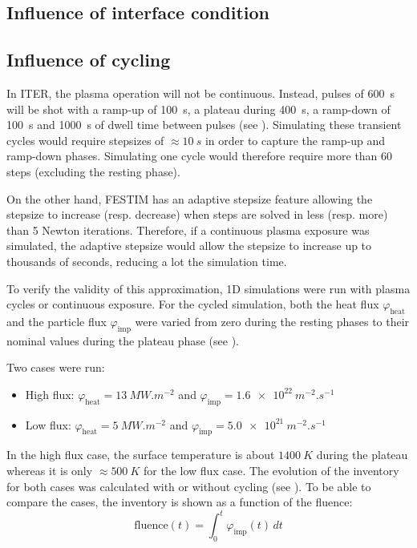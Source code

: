 \subsection{Influence of interface condition}


\subsection{Influence of cycling}

In ITER, the plasma operation will not be continuous.
Instead, pulses of \SI{600}{s} will be shot  with a ramp-up of \SI{100}{s}, a plateau during \SI{400}{s}, a ramp-down of \SI{100}{s} and \SI{1000}{s} of dwell time between pulses (see ).
Simulating these transient cycles would require stepsizes of $\approx \SI{10}{s}$ in order to capture the ramp-up and ramp-down phases.
Simulating one cycle would therefore require more than 60 steps (excluding the resting phase).

On the other hand, FESTIM has an adaptive stepsize feature allowing the stepsize to increase (resp. decrease) when steps are solved in less (resp. more) than 5 Newton iterations.
Therefore, if a continuous plasma exposure was simulated, the adaptive stepsize would allow the stepsize to increase up to thousands of seconds, reducing a lot the simulation time.

To verify the validity of this approximation, 1D simulations were run with plasma cycles or continuous exposure.
For the cycled simulation, both the heat flux $\varphi_\mathrm{heat}$ and the particle flux $\varphi_\mathrm{imp}$ were varied from zero during the resting phases to their nominal values during the plateau phase (see ).

Two cases were run:
\begin{itemize}
    \item High flux: $\varphi_\mathrm{heat} = \SI{13}{MW.m^{-2}}$ and $\varphi_\mathrm{imp} = \SI{1.6e22}{m^{-2}.s^{-1}}$
    \item Low flux: $\varphi_\mathrm{heat} = \SI{5}{MW.m^{-2}}$ and $\varphi_\mathrm{imp} = \SI{5.0e21}{m^{-2}.s^{-1}}$
\end{itemize}

In the high flux case, the surface temperature is about $\SI{1400}{K}$ during the plateau whereas it is only $\approx \SI{500}{K}$ for the low flux case.
The evolution of the inventory for both cases was calculated with or without cycling (see ).
To be able to compare the cases, the inventory is shown as a function of the fluence:
\begin{equation}
    \mathrm{fluence}(t) = \int_0^t \varphi_\mathrm{imp}(t) \, dt
\end{equation}



